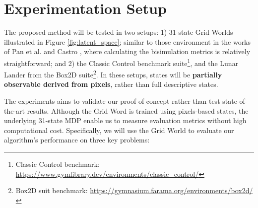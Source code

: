 \section{Experimentation Setup}
\label{sec:experimental_setup}

The proposed method will be tested in two setups: 1) 31-state Grid Worlds illustrated in Figure \ref{fig:latent_space}; similar to those environment in the works of Pan et al. \cite{pan2022understanding} and Castro \cite{castro2020scalable}, where calculating the bisimulation metrics is relatively straightforward; and 2) the Classic Control benchmark suite\footnote{Classic Control benchmark: \href{https://www.gymlibrary.dev/environments/classic_control/}{https://www.gymlibrary.dev/environments/classic\_control/}}, and the Lunar Lander from the Box2D suite\footnote{Box2D suit benchmark: \href{https://gymnasium.farama.org/environments/box2d/}{https://gymnasium.farama.org/environments/box2d/}}. In these setups, states will be \textbf{partially observable derived from pixels}, rather than full descriptive states.

The experiments aims to validate our proof of concept rather than test state-of-the-art results. Although the Grid Word is trained using pixels-based states, the underlying 31-state MDP enable us to measure evaluation metrics without high computational cost. Specifically, we will use the Grid World to evaluate our algorithm's performance on three key problems:

